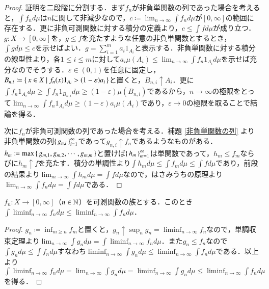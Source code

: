 \begin{proof}
証明を二段階に分割する．まず$f_n$が非負単関数の列であった場合を考えると，$\int f_n d \mu$は$n$に関して非減少なので，$c \coloneqq \lim_{n \to \infty}\int f_n d \mu$が$[0,\infty]$の範囲に存在する．更に非負可測関数に対する積分の定義より，$c \leq \int f d\mu$が成り立つ．$g \colon X \to [0,\infty]$を，$g \leq f$を充たすような任意の非負単関数とするとき，$\int g d \mu \leq c$を示せばよい．$g = \sum_{i=1}^m a_i 1_{A_i}$と表示する．非負単関数に対する積分の線型性より，各$1 \leq i \leq m$に対して$a_i \mu(A_i) \leq \lim_{n\to\infty} \int f_n1_{A_i} d \mu$を示せば充分なのでそうする．$\varepsilon \in (0,1)$を任意に固定し，$B_{n,i} \coloneqq \set{x \in X | f_n(x) 1_{A_i} > (1-\varepsilon) a_i }$と置くと，$B_{n,i} \uparrow A_i$．更に$\int f_n 1_{A_i} d \mu \geq \int f_n 1_{B_{n,i}} d\mu \geq (1-\varepsilon) \mu(B_{n,i})$であるから，$n \to \infty$の極限をとって$\lim_{n \to \infty} \int f_n 1_{A_i} d \mu \geq (1-\varepsilon) a_i \mu(A_i)$であり，$\varepsilon \to 0$の極限を取ることで結論を得る．

次に$f_n$が非負可測関数の列であった場合を考える．補題 \ref{非負単関数の列} より非負単関数の列$\set{g_{n,i}}_{i=1}^\infty$であって$g_{n,i} \uparrow f_n$であるようなものがある．$h_m \coloneqq \max\set{ g_{m,1}, g_{m,2},\cdots, g_{m,m} }$と置けば$\set{h_m}_{m=1}^\infty$は単関数であって，$h_m \leq f_m$ならびに$h_m \uparrow f$を充たす．積分の単調性より$\int h_m d \mu \leq \int f_m d\mu \leq \int f d\mu$であり，前段の結果より$\lim_{m \to \infty} \int h_m d\mu = \int f d\mu$なので，はさみうちの原理より$\lim_{n \to \infty} \int f_n d\mu = \int f d\mu$である．
\end{proof}

\begin{thm}
$f_n \colon X \to [0,\infty]$（$n \in \mathbb{N}$）を可測関数の族とする．このとき$\int \liminf_{n \to \infty} f_n d\mu \leq \liminf_{n \to \infty} \int f_n d\mu $．
\end{thm}

\begin{proof}
$g_n \coloneqq \inf_{m \geq n} f_m$と置くと，$g_n \uparrow \sup_n g_n = \liminf_{n \to \infty} f_n$なので，単調収束定理より$\lim_{n \to \infty}\int g_n d \mu = \int \liminf_{n \to \infty} f_n d \mu$．また$g_n \leq f_n$なので$\int g_n d \mu \leq \int f_n d \mu$すなわち$\liminf_{n \to \infty}\int g_n d \mu \leq \liminf_{n\to\infty} \int f_n d \mu$である．以上より$\int \liminf_{n \to \infty} f_n d \mu = \lim_{n \to \infty}\int g_n d \mu = \liminf_{n \to \infty}\int g_n d \mu \leq \liminf_{n\to\infty} \int f_n d \mu$を得る．
\end{proof}

